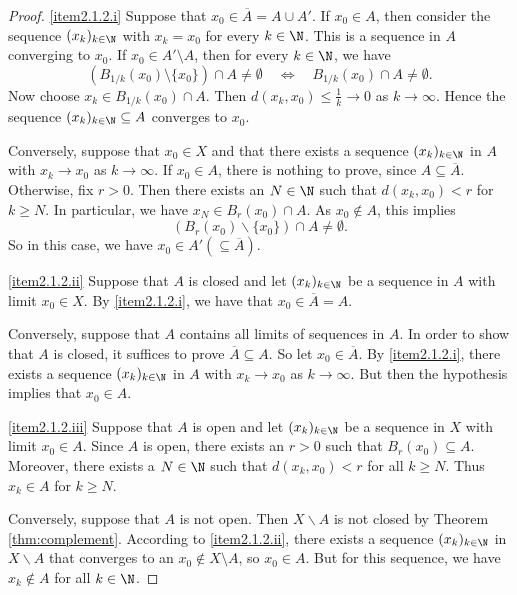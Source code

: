 \begin{proof}
\eqref{item2.1.2.i} Suppose that $x_0 \in \overline{A}= A \cup A'$. If $x_0 \in A$, then consider the sequence $(x_k)_{k \in \N}$ with
$x_k = x_0$ for every $k \in \N$. This is a sequence in $A$ converging to $x_0$. If $x_0 \in A'\setminus A$,
then for every $k \in \N$, we have
\[
(B_{1/k}(x_0)\setminus\{x_0\}) \cap A \not= \emptyset \quad \Leftrightarrow \quad B_{1/k}(x_0) \cap A \not= \emptyset.
\]
Now choose $x_k \in B_{1/k}(x_0) \cap A$. Then $d(x_k,x_0) \le \frac{1}{k} \to 0$ as $k \to \infty$.
Hence the sequence $(x_k)_{k \in \N}\subseteq A$ converges to $x_0$.

Conversely, suppose that $x_0 \in X$ and that there exists a sequence $(x_k)_{k \in \N}$ in $A$
with $x_k \to x_0$ as $k \to \infty$. If $x_0 \in A$, there is nothing to prove, since $A\subseteq \overline{A}$. Otherwise,
fix $r > 0$. Then there exists an $N \in \N$ such that $d(x_k,x_0) < r$ for $k \ge N$.
In particular, we have $x_N \in B_r(x_0) \cap A$. As $x_0 \not\in A$, this implies
\[
\left(B_r(x_0) \backslash \{x_0\}\right) \cap A \not= \emptyset.
\]
So in this case, we have $x_0 \in A' (\subseteq \overline A)$.

\np

\eqref{item2.1.2.ii} Suppose that $A$ is closed and let $(x_k)_{k \in \N}$ be a sequence
in $A$ with limit $x_0 \in X$. By \eqref{item2.1.2.i}, we have that $x_0 \in \overline{A} = A$.

Conversely, suppose that $A$ contains all limits of sequences in $A$. In order to show
that $A$ is closed, it suffices to prove $\overline{A} \subseteq A$. So let $x_0 \in \overline{A}$.
By \eqref{item2.1.2.i}, there exists a sequence $(x_k)_{k \in \N}$ in $A$ with $x_k \to x_0$
as $k \to \infty$. But then the hypothesis implies that $x_0 \in A$.

\bis

\eqref{item2.1.2.iii} Suppose that $A$ is open and let $(x_k)_{k \in \N}$ be a sequence in $X$
with limit $x_0 \in A$. Since $A$ is open, there exists an $r > 0$ such that $B_r(x_0) \subseteq A$.
Moreover, there exists a $N \in \N$ such that $d(x_k,x_0) < r$ for all $k \ge N$.
Thus $x_k \in A$ for $k \ge N$.

Conversely, suppose that $A$ is not open. Then $X \backslash A$ is not closed
by Theorem \ref{thm:complement}. According to \eqref{item2.1.2.ii}, there exists
a sequence $(x_k)_{k \in \N}$ in $X \backslash A$ that converges to an $x_0 \notin X\setminus A$, so $x_0\in A$.
But for this sequence, we have $x_k \not\in A$ for all $k \in \N$.
\end{proof}




